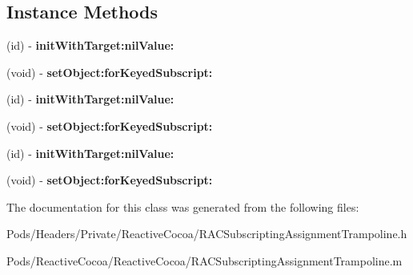 \subsection*{Instance Methods}
\begin{DoxyCompactItemize}
\item 
\mbox{\label{interface_r_a_c_subscripting_assignment_trampoline_adba67da173a946b2b65250855be32d59}} 
(id) -\/ {\bfseries init\+With\+Target\+:nil\+Value\+:}
\item 
\mbox{\label{interface_r_a_c_subscripting_assignment_trampoline_a9df73fc7fa842b146791fb7d71792c83}} 
(void) -\/ {\bfseries set\+Object\+:for\+Keyed\+Subscript\+:}
\item 
\mbox{\label{interface_r_a_c_subscripting_assignment_trampoline_adba67da173a946b2b65250855be32d59}} 
(id) -\/ {\bfseries init\+With\+Target\+:nil\+Value\+:}
\item 
\mbox{\label{interface_r_a_c_subscripting_assignment_trampoline_a9df73fc7fa842b146791fb7d71792c83}} 
(void) -\/ {\bfseries set\+Object\+:for\+Keyed\+Subscript\+:}
\item 
\mbox{\label{interface_r_a_c_subscripting_assignment_trampoline_adba67da173a946b2b65250855be32d59}} 
(id) -\/ {\bfseries init\+With\+Target\+:nil\+Value\+:}
\item 
\mbox{\label{interface_r_a_c_subscripting_assignment_trampoline_a9df73fc7fa842b146791fb7d71792c83}} 
(void) -\/ {\bfseries set\+Object\+:for\+Keyed\+Subscript\+:}
\end{DoxyCompactItemize}


The documentation for this class was generated from the following files\+:\begin{DoxyCompactItemize}
\item 
Pods/\+Headers/\+Private/\+Reactive\+Cocoa/R\+A\+C\+Subscripting\+Assignment\+Trampoline.\+h\item 
Pods/\+Reactive\+Cocoa/\+Reactive\+Cocoa/R\+A\+C\+Subscripting\+Assignment\+Trampoline.\+m\end{DoxyCompactItemize}
